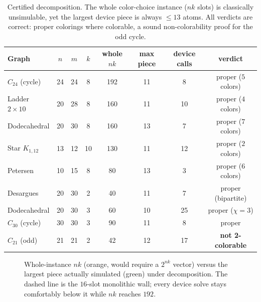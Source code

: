 \documentclass[11pt]{article}
\theoremstyle{definition}
\theoremstyle{remark}
\begin{document}
\begin{table}[h]
\centering
\small
\begin{tabular}{@{}lccccccc@{}}
\toprule
Graph & $n$ & $m$ & $k$ & whole $nk$ & max piece & device calls & verdict \\
\midrule
$C_{24}$ (cycle)      & 24 & 24 & 8  & 192 & 11 & 8  & proper ($5$ colors) \\
Ladder $2{\times}10$  & 20 & 28 & 8  & 160 & 11 & 10 & proper ($4$ colors) \\
Dodecahedral          & 20 & 30 & 8  & 160 & 13 & 7  & proper ($7$ colors) \\
Star $K_{1,12}$       & 13 & 12 & 10 & 130 & 11 & 12 & proper ($2$ colors) \\
Petersen              & 10 & 15 & 8  & 80  & 13 & 3  & proper ($6$ colors) \\
\midrule
Desargues             & 20 & 30 & 2  & 40  & 11 & 7  & proper (bipartite) \\
Dodecahedral          & 20 & 30 & 3  & 60  & 10 & 25 & proper ($\chi=3$) \\
$C_{30}$ (cycle)      & 30 & 30 & 3  & 90  & 11 & 8  & proper \\
$C_{21}$ (odd)        & 21 & 21 & 2  & 42  & 12 & 17 & \textbf{not 2-colorable} \\
\bottomrule
\end{tabular}
\caption{Certified decomposition. The whole color-choice instance ($nk$ slots) is
classically unsimulable, yet the largest device piece is always $\le 13$ atoms.
All verdicts are correct: proper colorings where colorable, a sound
non-colorability proof for the odd cycle.}
\label{tab:decomp}
\end{table}

\begin{figure}[h]
\centering
{}
\caption{Whole-instance $nk$ (orange, would require a $2^{nk}$ vector) versus the
largest piece actually simulated (green) under decomposition. The dashed line is
the $16$-slot monolithic wall; every device solve stays comfortably below it while
$nk$ reaches $192$.}
\label{fig:decomp}
\end{figure}
\end{document}
